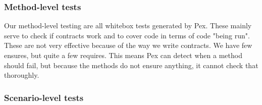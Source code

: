 \subsubsection{Method-level tests}
\label{testing_strategy_types_method}
Our method-level testing are all whitebox tests generated by Pex. These mainly serve to check if contracts work and to cover code in terms of code "being run". These are not very effective because of the way we write contracts. We have few ensures, but quite a few requires. This means Pex can detect when a method should fail, but because the methods do not ensure anything, it cannot check that thoroughly.

\subsubsection{Scenario-level tests}
